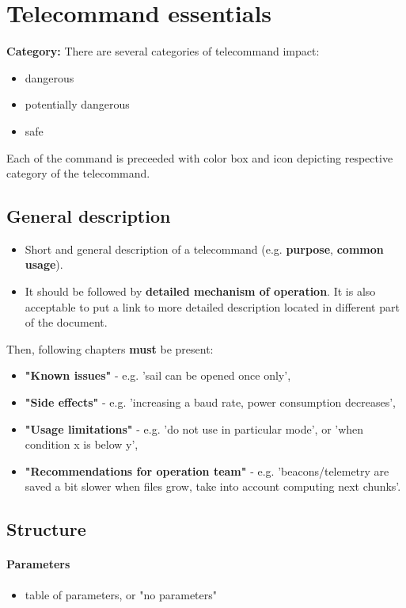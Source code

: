 \section{Telecommand essentials}

\textbf{Category:} There are several categories of telecommand impact:
\begin{itemize}
    \item dangerous
    \item potentially dangerous
    \item safe
\end{itemize}

Each of the command is preceeded with color box and icon depicting respective category of the telecommand. 

\subsection{General description}
\begin{itemize}
    \item Short and general description of a telecommand (e.g. \textbf{purpose}, \textbf{common usage}).
    \item It should be followed by \textbf{detailed mechanism of operation}. It is also acceptable to put a link to more detailed description located in different part of the document.
\end{itemize}

Then, following chapters \textbf{must} be present:
\begin{itemize}
    \item \textbf{"Known issues"} - e.g. 'sail can be opened once only',
    \item \textbf{"Side effects"} - e.g. 'increasing a baud rate, power consumption decreases',
    \item \textbf{"Usage limitations"} - e.g. 'do not use in particular mode', or 'when condition x is below y',
    \item \textbf{"Recommendations for operation team"} - e.g. 'beacons/telemetry are saved a bit slower when files grow, take into account computing next chunks'.
\end{itemize}

\subsection{Structure}

\paragraph{Parameters}
    \begin{itemize}
    \item table of parameters, or "no parameters"
    \end{itemize}

